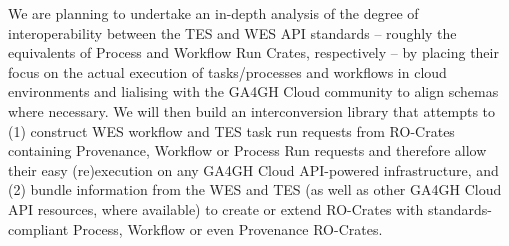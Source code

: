 We are planning to undertake an in-depth analysis of the degree of interoperability between the TES and WES API standards -- roughly the equivalents of Process and Workflow Run Crates, respectively – by placing their focus on the actual execution of tasks/processes and workflows in cloud environments and lialising with the GA4GH Cloud community to align schemas where necessary.
We will then build an interconversion library that attempts to (1) construct WES workflow and TES task run requests from RO-Crates containing Provenance, Workflow or Process Run requests and therefore allow their easy (re)execution on any GA4GH Cloud API-powered infrastructure, and (2) bundle information from the WES and TES (as well as other GA4GH Cloud API resources, where available) to create or extend RO-Crates with standards-compliant Process, Workflow or even Provenance RO-Crates.

